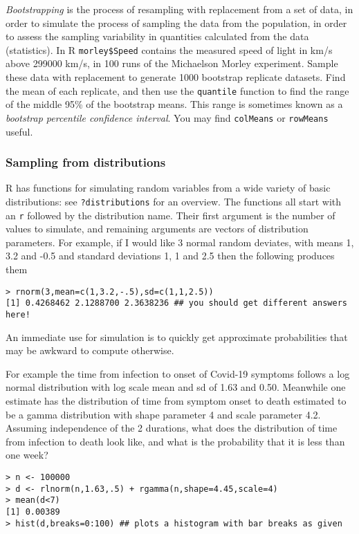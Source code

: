 \documentclass[10pt] {article}
\newcommand{\eps}[3]
{{\begin{center}
 \rotatebox{#1}{\scalebox{#2}{\texttt{[image: \#3]}}}
 \end{center}}
}
\theoremstyle{definition}
\begin{document}
 {\em Bootstrapping} is the process of resampling with replacement from a set of data, in order to simulate the process of sampling the data from the population, in order to assess the sampling variability in quantities calculated from the data (statistics). In R \lstinline+morley$Speed+ contains the measured speed of light in km/s above 299000 km/s, in 100 runs of the Michaelson Morley experiment. Sample these data with replacement to generate 1000 bootstrap replicate datasets. Find the mean of each replicate, and then use the {\tt quantile} function to find the range of the middle 95\% of the bootstrap means. This range is sometimes known as a {\em bootstrap percentile confidence interval}. You may find {\tt colMeans} or {\tt rowMeans} useful.  

\subsubsection{Sampling from distributions}

R has functions for simulating random variables from a wide variety of basic distributions: see {\tt ?distributions} for an overview. The functions all start with an {\tt r} followed by the distribution name. Their first argument is the number of values to simulate, and remaining arguments are vectors of distribution parameters. For example, if I would like 3 normal random deviates, with means 1, 3.2 and -0.5 and standard deviations 1, 1 and 2.5 then the following produces them
\begin{lstlisting}
> rnorm(3,mean=c(1,3.2,-.5),sd=c(1,1,2.5))
[1] 0.4268462 2.1288700 2.3638236 ## you should get different answers here!
\end{lstlisting}
An immediate use for simulation is to quickly get approximate probabilities that may be awkward to compute otherwise. 

For example the time from infection to onset of Covid-19 symptoms follows a log normal distribution with log scale mean and sd of 1.63 and 0.50. Meanwhile one estimate has the distribution of time from symptom onset to death estimated to be a gamma distribution with shape parameter 4 and scale parameter 4.2. Assuming independence of the 2 durations, what does the distribution of time from infection to death look like, and what is the probability that it is less than one week? 
\begin{lstlisting}
> n <- 100000
> d <- rlnorm(n,1.63,.5) + rgamma(n,shape=4.45,scale=4)
> mean(d<7)
[1] 0.00389
> hist(d,breaks=0:100) ## plots a histogram with bar breaks as given
\end{lstlisting}
\eps{-90}{.5}{i2d.eps}
\end{document}
